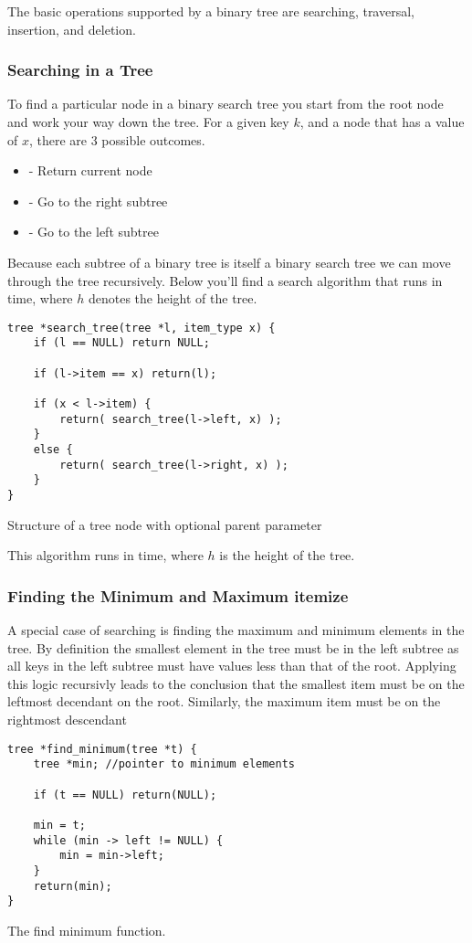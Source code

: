 	The basic operations supported by a binary tree are searching, traversal, insertion, and deletion.
		\subsubsection{Searching in a Tree}
	To find a particular node in a binary search tree you start from the root node and work your way down the tree. For a given key $k$, and a node that has a value of $x$, there are 3 possible outcomes.
	\begin{itemize}
		\item  - Return current node
		\item  - Go to the right subtree
		\item  - Go to the left subtree
	\end{itemize}
	Because each subtree of a binary tree is itself a binary search tree we can move through the tree recursively. Below you'll find a search algorithm that runs in  time, where $h$ denotes the height of the tree.

	\begin{listing}[h]
		\begin{verbatim}
tree *search_tree(tree *l, item_type x) {
	if (l == NULL) return NULL;

	if (l->item == x) return(l);

	if (x < l->item) {
		return( search_tree(l->left, x) );
	}
	else {
		return( search_tree(l->right, x) );
	}
}
\end{verbatim}
		\caption{\label{code:structtree} Structure of a tree node with optional parent parameter}
	\end{listing}
	This algorithm runs in  time, where $h$ is the height of the tree.
		\subsubsection{Finding the Minimum and Maximum itemize}
	A special case of searching is finding the maximum and minimum elements in the tree. By definition the smallest element in the tree must be in the left subtree as all keys in the left subtree must have values less than that of the root. Applying this logic recursivly leads to the conclusion that the smallest item must be on the leftmost decendant on the root. Similarly, the maximum item must be on the rightmost descendant
	\begin{listing}[h]
		\begin{verbatim}
tree *find_minimum(tree *t) {
	tree *min; //pointer to minimum elements

	if (t == NULL) return(NULL);

	min = t;
	while (min -> left != NULL) {
		min = min->left;
	}
	return(min);
}
		\end{verbatim}
		\caption{\label{code:findmintree} The find minimum function.}
	\end{listing}

